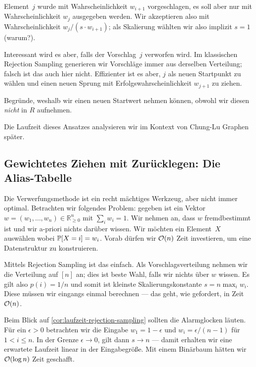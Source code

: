 Element~$j$ wurde mit Wahrscheinlichkeit $w_{i+1}$ vorgeschlagen, es soll aber nur mit Wahrscheinlichkeit $w_j$ ausgegeben werden.
Wir akzeptieren also mit Wahrscheinlichkeit $w_{j} / (s \cdot w_{i+1})$; als Skalierung wählten wir also implizit $s=1$ (warum?).

Interessant wird es aber, falls der Vorschlag~$j$ verworfen wird.
Im klassischen Rejection Sampling generieren wir Vorschläge immer aus derselben Verteilung; falsch ist das auch hier nicht.
Effizienter ist es aber, $j$ als neuen Startpunkt zu wählen und einen neuen Sprung mit Erfolgswahrscheinlichkeit $w_{j+1}$ zu ziehen.

\begin{exercise}
    Begründe, weshalb wir einen neuen Startwert nehmen können, obwohl wir diesen \emph{nicht} in $R$ aufnehmen.
\end{exercise}

Die Laufzeit dieses Ansatzes analysieren wir im Kontext von Chung-Lu Graphen später.

\subsection{Gewichtetes Ziehen mit Zurücklegen: Die Alias-Tabelle}\label{subsec:alias1}
Die Verwerfungsmethode ist ein recht mächtiges Werkzeug, aber nicht immer optimal.
Betrachten wir folgendes Problem:
gegeben ist ein Vektor $w = (w_1, \ldots, w_n) \in \mathbb R_{\ge 0}^n$ mit $\sum_i w_i = 1$.
Wir nehmen an, dass $w$ fremdbestimmt ist und wir a-priori nichts darüber wissen.
Wir möchten ein Element~$X$ auswählen wobei $\mathbb{P}\!\left[X = i\right] = w_i$.
Vorab dürfen wir $\mathcal{O}\!\left(n\right)$ Zeit investieren, um eine Datenstruktur zu konstruieren.

Mittels Rejection Sampling ist das einfach.
Als Vorschlagsverteilung nehmen wir die Verteilung auf $[n]$ an; dies ist beste Wahl, falls wir nichts über $w$ wissen.
Es gilt also $p(i) = 1/n$ und somit ist kleinste Skalierungskonstante $s = n \max_i{w_i}$.
Diese müssen wir eingangs einmal berechnen --- das geht, wie gefordert, in Zeit $\mathcal{O}\!\left(n\right)$.

Beim Blick auf \cref{cor:laufzeit-rejection-sampling} sollten die Alarmglocken läuten.
Für ein $\epsilon > 0$ betrachten wir die Eingabe $w_1 = 1 - \epsilon$ und $w_i = \epsilon / (n - 1)$ für $1 < i \le n$.
In der Grenze $\epsilon \to 0$, gilt dann $s \to n$  --- damit erhalten wir eine erwartete Laufzeit linear in der Eingabegröße.
Mit einem Binärbaum hätten wir $\mathcal{O}\!\left(\log n\right)$ Zeit geschafft.

